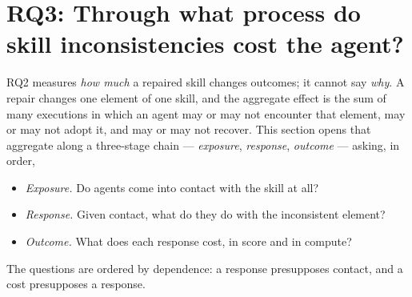
\section{RQ3: Through what process do skill inconsistencies cost the agent?}
\label{sec:rq3}

RQ2 measures \emph{how much} a repaired skill changes outcomes; it cannot say \emph{why}. A repair
changes one element of one skill, and the aggregate effect is the sum of many executions in which an
agent may or may not encounter that element, may or may not adopt it, and may or may not recover. This
section opens that aggregate along a three-stage chain --- \emph{exposure}, \emph{response},
\emph{outcome} --- asking, in order,

\begin{itemize}
  \item[\textbf{RQ3.1}] \emph{Exposure.} Do agents come into contact with the skill at all?
  \item[\textbf{RQ3.2}] \emph{Response.} Given contact, what do they do with the inconsistent element?
  \item[\textbf{RQ3.3}] \emph{Outcome.} What does each response cost, in score and in compute?
\end{itemize}

The questions are ordered by dependence: a response presupposes contact, and a cost presupposes a
response.

